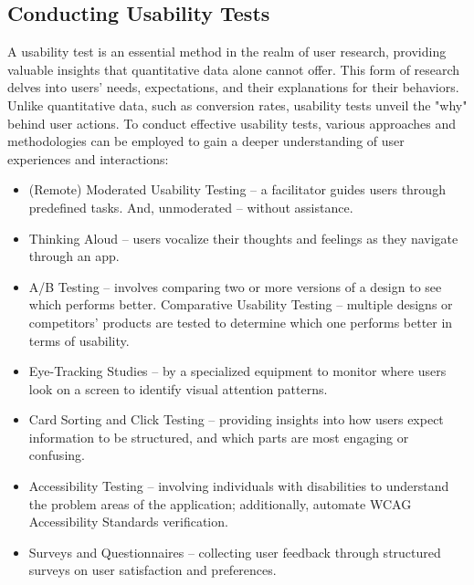 
\subsection{Conducting Usability Tests}

A usability test is an essential method in the realm of user research, providing valuable insights that quantitative 
data alone cannot offer. This form of research delves into users' needs, expectations, and their explanations for 
their behaviors. Unlike quantitative data, such as conversion rates, usability tests unveil the "why" behind user 
actions. To conduct effective usability tests, various approaches and methodologies can be employed to gain a deeper 
understanding of user experiences and interactions:

\begin{itemize}
  \item (Remote) Moderated Usability Testing -- a facilitator guides users through predefined tasks. And, unmoderated 
  -- without assistance.

  \item Thinking Aloud -- users vocalize their thoughts and feelings as they navigate through an app.

  \item A/B Testing -- involves comparing two or more versions of a design to see which performs better. 
  Comparative Usability Testing -- multiple designs or competitors' products are tested to determine which one 
  performs better in terms of usability.

  \item Eye-Tracking Studies -- by a specialized equipment to monitor where users look on a screen to identify visual 
  attention patterns.

  \item Card Sorting and Click Testing -- providing insights into how users expect information to be structured, and 
  which parts are most engaging or confusing.

  \item Accessibility Testing -- involving individuals with disabilities to understand the problem areas of the 
  application; additionally, automate WCAG Accessibility Standards verification.

  \item Surveys and Questionnaires -- collecting user feedback through structured surveys on user satisfaction and 
  preferences.
\end{itemize}
